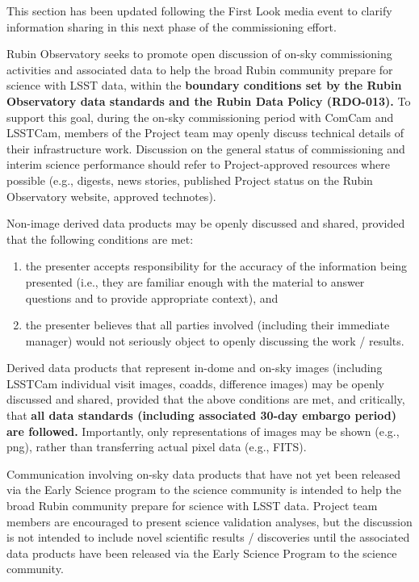 \documentclass[SE,authoryear,toc]{lsstdoc}
\begin{document}
\begin{note}
This section has been updated following the First Look media event to clarify information sharing in this next phase of the commissioning effort.
\end{note}

Rubin Observatory seeks to promote open discussion of on-sky commissioning activities and associated data to help the broad Rubin community prepare for science with LSST data, within the \textbf{boundary conditions set by the Rubin Observatory data standards and the Rubin Data Policy (RDO-013).}
To support this goal, during the on-sky commissioning period with ComCam and LSSTCam, members of the Project team may openly discuss technical details of their infrastructure work.
Discussion on the general status of commissioning and interim science performance should refer to Project-approved resources where possible (e.g., digests, news stories, published Project status on the Rubin Observatory website, approved technotes).


Non-image derived data products may be openly discussed and shared, provided that the following conditions are met:

\begin{enumerate}

\item the presenter accepts responsibility for the accuracy of the information being presented (i.e., they are familiar enough with the material to answer questions and to provide appropriate context), and

\item the presenter believes that all parties involved (including their immediate manager) would not seriously object to openly discussing the work / results.

\end{enumerate}

Derived data products that represent in-dome and on-sky images (including LSSTCam individual visit images, coadds, difference images) may be openly discussed and shared, provided that the above conditions are met, and critically, that \textbf{all data standards (including associated 30-day embargo period) are followed.}
Importantly, only representations of images may be shown (e.g., png), rather than transferring actual pixel data (e.g., FITS).

Communication involving on-sky data products that have not yet been released via the Early Science program to the science community is intended to help the broad Rubin community prepare for science with LSST data.
Project team members are encouraged to present science validation analyses, but the discussion is not intended to include novel scientific results / discoveries until the associated data products have been released via the Early Science Program to the science community.
\end{document}
